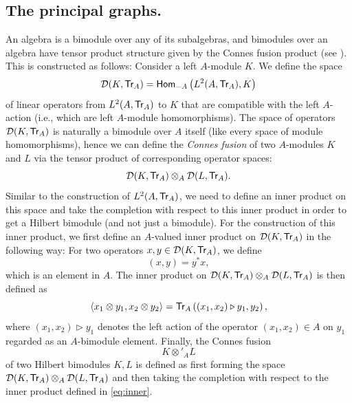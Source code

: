 \subsection*{The principal graphs.}

An algebra is a bimodule over any of its subalgebras, and bimodules over an algebra have tensor product structure given by the Connes fusion product (see \cite{Connes80,Thom2006}). This is constructed as follows: Consider a left $A$-module $K$. We define the space
	\begin{equation}
		\mathcal{D}(K,\mathsf{Tr}_A)=\mathsf{Hom}_{-A}\left(L^2(A,\mathsf{Tr}_A),K\right)
	\end{equation}
of linear operators from $L^2(A,\mathsf{Tr}_A)$ to $K$ that are compatible with the left $A$-action (i.e., which are left $A$-module homomorphisms). The space of operators $\mathcal{D}(K,\mathsf{Tr}_A)$ is naturally a bimodule over $A$ itself (like every space of module homomorphisms), hence we can define the \emph{Connes fusion} of two $A$-modules $K$ and $L$ via the tensor product of corresponding operator spaces:
	\begin{equation}
		\mathcal{D}(K,\mathsf{Tr}_A)\otimes_A \mathcal{D}(L,\mathsf{Tr}_A).
	\end{equation}
Similar to the construction of $L^2(A,\mathsf{Tr}_A)$, we need to define an inner product on this space and take the completion with respect to this inner product in order to get a Hilbert bimodule (and not just a bimodule). For the construction of this inner product, we first define an $A$-valued inner product on $\mathcal{D}(K,\mathsf{Tr}_A)$ in the following way: For two operators $x,y\in\mathcal{D}(K,\mathsf{Tr}_A)$, we define
	\begin{equation}
		(x,y)=y^* x,
	\end{equation}
which is an element in $A$. The inner product on $\mathcal{D}(K,\mathsf{Tr}_A)\otimes_A \mathcal{D}(L,\mathsf{Tr}_A)$ is then defined as
	\begin{equation}
	\label{eq:inner}
		\langle x_1\otimes y_1,x_2\otimes y_2\rangle=\mathsf{Tr}_A\left((x_1,x_2)\triangleright y_1,y_2\right),
	\end{equation}
where $(x_1,x_2)\triangleright y_1$ denotes the left action of the operator $(x_1,x_2)\in A$ on $y_1$ regarded as an $A$-bimodule element. Finally, the Connes fusion 
	\begin{equation}
		K\otimes'_A L
	\end{equation}
of two Hilbert bimodules $K,L$ is defined as first forming the space $\mathcal{D}(K,\mathsf{Tr}_A)\otimes_A \mathcal{D}(L,\mathsf{Tr}_A)$ and then taking the completion with respect to the inner product defined in \cref{eq:inner}.


